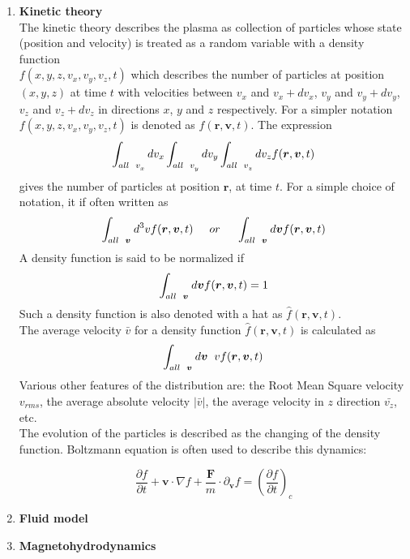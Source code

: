 \documentclass[12pt]{article}
\begin{document}
\begin{enumerate}
		\item \textbf{Kinetic theory} \\
		The kinetic theory describes the plasma as collection of particles whose state (position and velocity) is treated as a random variable with a density function \\ $ f(x, y, z, v_{x}, v_{y}, v_{z}, t) $ which describes the number of particles at position $ (x, y, z) $ at time $ t $ with velocities between $ v_{x} $ and $ v_{x} + dv_{x} $, $ v_{y} $ and $ v_{y} + dv_{y} $, $ v_{z} $ and $ v_{z} + dv_{z} $ in directions $x$, $y$ and $z$ respectively. For a simpler notation $ f(x, y, z, v_{x}, v_{y}, v_{z}, t) $ is denoted as $ f(\boldsymbol{r}, \boldsymbol{v}, t) $.
		The expression $$\displaystyle \int_{all \hspace{0.2cm} v_{x}^{}} dv_{x} \int_{all \hspace{0.2cm} v_{y}^{}} dv_{y} \int_{all \hspace{0.2cm} v_{z}^{}} dv_{z} f(\boldsymbol{r}, \boldsymbol{v}, t) $$ gives the number of particles at position $\boldsymbol{r}$, at time $t$.  For a simple choice of notation, it if often written as $$\displaystyle \int_{all \hspace{0.2cm} \boldsymbol{v}^{}} d^{3}v f(\boldsymbol{r}, \boldsymbol{v}, t) \hspace{0.5cm}\mathnormal{or} \hspace{0.5cm}\int_{all \hspace{0.2cm} \boldsymbol{v}^{}} d\boldsymbol{v} f(\boldsymbol{r}, \boldsymbol{v}, t)$$ A density function is said to be normalized if $$\displaystyle \int_{all \hspace{0.2cm} \boldsymbol{v}^{}} d\boldsymbol{v} f(\boldsymbol{r}, \boldsymbol{v}, t) = 1$$ Such a density function is also denoted with a hat as $ \hat{f}(\boldsymbol{r}, \boldsymbol{v}, t) $.\\
		\noindent The average velocity $\bar{v}$ for a density function $ \hat{f}(\boldsymbol{r}, \boldsymbol{v}, t) $ is calculated as  $$\displaystyle \int_{all \hspace{0.2cm} \boldsymbol{v}^{}} d\boldsymbol{v} \hspace{0.2cm} v f(\boldsymbol{r}, \boldsymbol{v}, t)$$ Various other features of the distribution are: the Root Mean Square velocity $v_{rms}$, the average absolute velocity $|\bar{v}|$, the average velocity in $z$ direction $\bar{v_{z}}$, etc.\\
		The evolution of the particles is described as the changing of the density function. Boltzmann equation is often used to describe this dynamics:
		
		$$\frac{\partial f}{\partial t} + \boldsymbol{v} \cdot \nabla f + \frac{\mathbf{F}}{m} \cdot {\partial}_{\boldsymbol{v}} f = \left(\frac{\partial f}{\partial t}\right)_{c}$$
		\item \textbf{Fluid model} \\
		
		\item \textbf{Magnetohydrodynamics} \\
	\end{enumerate}
	
\end{document}
